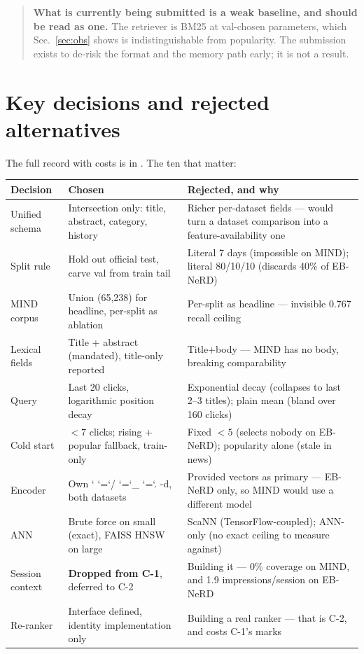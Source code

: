 \documentclass[11pt,a4paper]{article}
\newcommand{\brk}[1]{%
  \begingroup\ttfamily\hyphenchar\font=-1
  \discretionary{}{}{}%
  \expandafter\brkscan\detokenize{#1}\relax\endgroup}
\def\brkscan#1{%
  \ifx#1\relax\else
    \char`#1%
    \ifnum`#1=`/ \penalty0 \fi
    \ifnum`#1=`_ \penalty0 \fi
    \ifnum`#1=`. \penalty0 \fi
    \expandafter\brkscan
  \fi}
\begin{document}
\begin{quote}\small
\textbf{What is currently being submitted is a weak baseline, and should be read as one.} The
retriever is BM25 at val-chosen parameters, which Sec.~\ref{sec:obs} shows is indistinguishable
from popularity. The submission exists to de-risk the format and the memory path early; it is not
a result.
\end{quote}

\section{Key decisions and rejected alternatives}\label{sec:dec}

The full record with costs is in \brk{decisions.md}. The ten that matter:

\begin{center}\small
\begin{tabular}{p{2.6cm}p{6.2cm}p{6.4cm}}
\toprule
Decision & Chosen & Rejected, and why \\
\midrule
Unified schema & Intersection only: title, abstract, category, history & Richer per-dataset fields --- would turn a dataset comparison into a feature-availability one \\
Split rule & Hold out official test, carve val from train tail & Literal 7 days (impossible on MIND); literal 80/10/10 (discards 40\% of EB-NeRD) \\
MIND corpus & Union (65,238) for headline, per-split as ablation & Per-split as headline --- invisible 0.767 recall ceiling \\
Lexical fields & Title + abstract (mandated), title-only reported & Title+body --- MIND has no body, breaking comparability \\
Query & Last 20 clicks, logarithmic position decay & Exponential decay (collapses to last 2--3 titles); plain mean (bland over 160 clicks) \\
Cold start & $<7$ clicks; rising + popular fallback, train-only & Fixed $<5$ (selects nobody on EB-NeRD); popularity alone (stale in news) \\
Encoder & Own \brk{xlm-roberta-base} 768-d, both datasets & Provided vectors as primary --- EB-NeRD only, so MIND would use a different model \\
ANN & Brute force on small (exact), FAISS HNSW on large & ScaNN (TensorFlow-coupled); ANN-only (no exact ceiling to measure against) \\
Session context & \textbf{Dropped from C-1}, deferred to C-2 & Building it --- 0\% coverage on MIND, and 1.9 impressions/session on EB-NeRD \\
Re-ranker & Interface defined, identity implementation only & Building a real ranker --- that is C-2, and costs C-1's marks \\
\bottomrule
\end{tabular}
\end{center}
\end{document}
